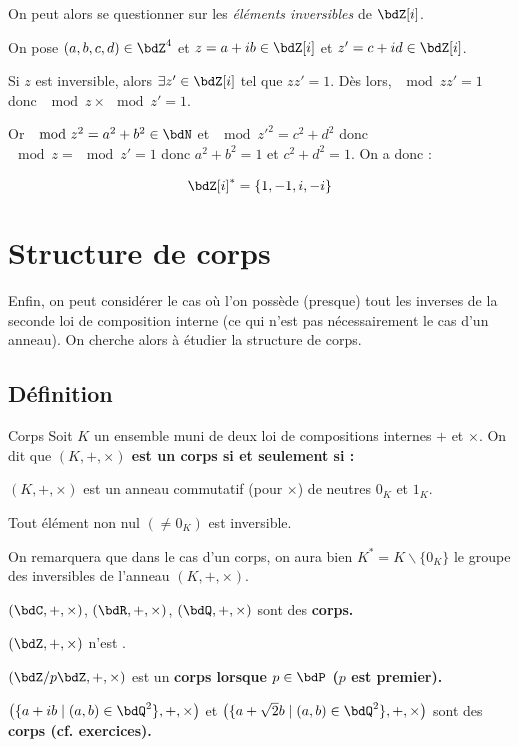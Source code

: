 \documentclass[a4paper,french,bookmarks]{article}
\begin{document}
On peut alors se questionner sur les \textit{éléments inversibles} de $\bdZ[i]$.

On pose $(a, b, c, d) \in \bdZ^4$ et $z = a + ib \in \bdZ[i]$ et $z' = c + id \in \bdZ[i]$. 

Si $z$ est inversible, alors $\exists z' \in \bdZ[i]$ tel que $zz' = 1$. Dès lors, $\mod{zz'} = 1$ donc $\mod{z}\times\mod{z'} = 1$.

Or $\mod{z}^2 = a^2 + b^2 \in \bdN$ et $\mod{z'}^2 = c^2 + d^2$ donc $\mod{z}=\mod{z'}=1$ donc $a^2+b^2 = 1$ et $c^2+d^2 = 1$. On a donc :

\[\bdZ[i]^* = \{1, -1, i, -i\}\]

\newpage 

\section{Structure de corps}

\qquad Enfin, on peut considérer le cas où l'on possède (presque) tout les inverses de la seconde loi de composition interne (ce qui n'est pas nécessairement le cas d'un anneau). On cherche alors à étudier la structure de corps.

\subsection{Définition}

\begin{definition}{Corps}{}
    Soit $K$ un ensemble muni de deux loi de compositions internes $+$ et $\times$. On dit que \bf{$(K, +, \times)$ est un corps} si et seulement si :
    
    \begin{enumerate}
        \ithand $(K, +, \times)$ est un anneau commutatif (pour $\times$) de neutres $0_K$ et $1_K$.
        
        \ithand Tout élément non nul $(\neq 0_K)$ est inversible.
    \end{enumerate}
\end{definition}
On remarquera que dans le cas d'un corps, on aura bien $K^* = K \backslash \{ 0_K \}$ le groupe des inversibles de l'anneau $(K, +, \times)$.

\begin{example}{}{}
    \begin{enumerate}
        \ithand $(\bdC, +, \times)$, $(\bdR, +, \times)$, $(\bdQ, +, \times)$ sont des \bf{corps}.
        
        \ithand $(\bdZ, +, \times)$ n'est \textit{}.
        
        \ithand $(\bdZ/p\bdZ, +, \times)$ est un \bf{corps lorsque $p \in \bdP$ ($p$ est premier)}.
        
        \ithand $\left(\{a + ib \mid (a, b) \in \bdQ^2\}, +, \times \right)$ et $\left(\{a + \sqrt{2} b \mid (a, b) \in \bdQ^2\}, +, \times \right)$ sont des \bf{corps} (cf. exercices).
    \end{enumerate}
\end{example}
\end{document}

